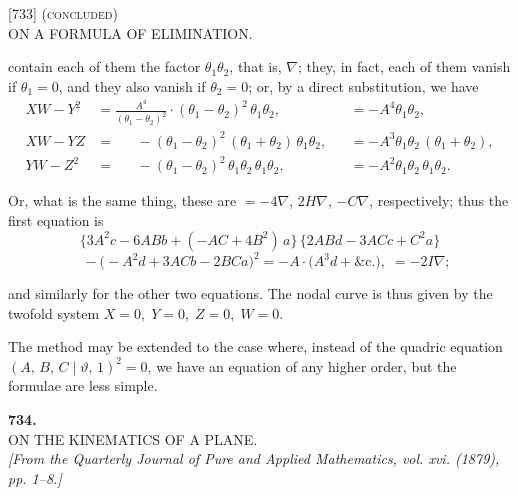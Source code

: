 \documentclass[11pt]{article}
\begin{document}
\begin{center}
\textsc{[733] (concluded)}\\[2pt]
\textsc{ON A FORMULA OF ELIMINATION.}
\end{center}

\bigskip

\noindent
contain each of them the factor $\theta_1 \theta_2$, that is, $\nabla$; they, in fact, each of them vanish
if $\theta_1 = 0$, and they also vanish if $\theta_2 = 0$; or, by a direct substitution, we have
\begin{align*}
XW - Y^2 &= \frac{A^4}{(\theta_1-\theta_2)^2}\cdot(\theta_1-\theta_2)^2\,\theta_1\theta_2,
            & &= -A^4 \theta_1 \theta_2,\\
XW - YZ &= \quad\;\; -(\theta_1-\theta_2)^2\,(\theta_1+\theta_2)\,\theta_1\theta_2,
            & &= -A^3 \theta_1 \theta_2\,(\theta_1+\theta_2),\\
YW - Z^2 &= \quad\;\; -(\theta_1-\theta_2)^2\,\theta_1\theta_2\,\theta_1\theta_2,
            & &= -A^2 \theta_1 \theta_2\,\theta_1\theta_2.
\end{align*}

\noindent
Or, what is the same thing, these are $= -4\nabla$, $2H\nabla$, $-C\nabla$, respectively; thus the
first equation is
\[
\bigl\{3A^2c - 6ABb + (-AC + 4B^2)\,a\bigr\}\,\bigl\{2ABd - 3ACc + C^2 a\bigr\}
\]
\[
\quad - \bigl(-A^2 d + 3ACb - 2BCa\bigr)^2 = -A\cdot\bigl(A^3 d + \&\mathrm{c.}\bigr), \; = -2I\nabla;
\]

\noindent
and similarly for the other two equations. The nodal curve is thus given by the
twofold system $X = 0,\; Y = 0,\; Z = 0,\; W = 0$.

\bigskip

The method may be extended to the case where, instead of the quadric equation
$(A,\, B,\, C \mid \vartheta,\, 1)^2 = 0$, we have an equation of any higher order, but the formulae are
less simple.

\bigskip

\begin{center}
\textbf{734.}\\[6pt]
\textsc{ON THE KINEMATICS OF A PLANE.}\\[6pt]
\textit{[From the Quarterly Journal of Pure and Applied Mathematics, vol. xvi. (1879),\\
pp. 1--8.]}
\end{center}
\end{document}
